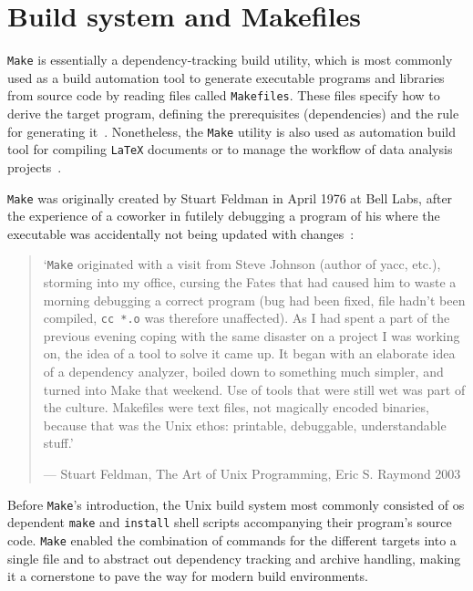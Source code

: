 %
\section{Build system and Makefiles}
\label{sec:make-makefiles}
\texttt{Make} is essentially a dependency-tracking build utility, which is most
commonly used as a build automation tool to generate executable programs and
libraries from source code by reading files called \texttt{Makefiles}. These
files specify how to derive the target program, defining the prerequisites
(dependencies) and the rule for generating
it~\cite{stallman2002gnu}. Nonetheless, the
\texttt{Make} utility is also used as automation build tool for compiling
\texttt{LaTeX} documents or to manage the workflow of data analysis projects~\cite{baker2020using}.

\texttt{Make} was originally created by Stuart Feldman in April 1976 at Bell
Labs, after the experience of a coworker in futilely debugging a program of his where the executable was accidentally not being updated with changes~\cite{raymond2003art}:
\begin{quote}
    `\texttt{Make} originated with a visit from Steve Johnson (author of yacc, etc.),
    storming into my office, cursing the Fates that had caused him to waste a
    morning debugging a correct program (bug had been fixed, file hadn't been
    compiled, \texttt{cc *.o} was therefore unaffected).
    As I had spent a part of the
    previous evening coping with the same disaster on a project I was working
    on, the idea of a tool to solve it came up. It began with an elaborate idea
    of a dependency analyzer, boiled down to something much simpler, and turned
    into Make that weekend. Use of tools that were still wet was part of the
    culture. Makefiles were text files, not magically encoded binaries, because
    that was the Unix ethos: printable, debuggable, understandable stuff.'
    
     --- Stuart Feldman, The Art of Unix Programming, Eric S. Raymond 2003
\end{quote}

Before \texttt{Make}'s introduction, the Unix build system most commonly
consisted of \gls{os} dependent \texttt{make} and \texttt{install} shell scripts
accompanying their program's source code.
\texttt{Make} enabled the combination of commands for the different targets into
a single file and to abstract out dependency tracking and archive handling,
making it a cornerstone to pave the way for modern build environments.

